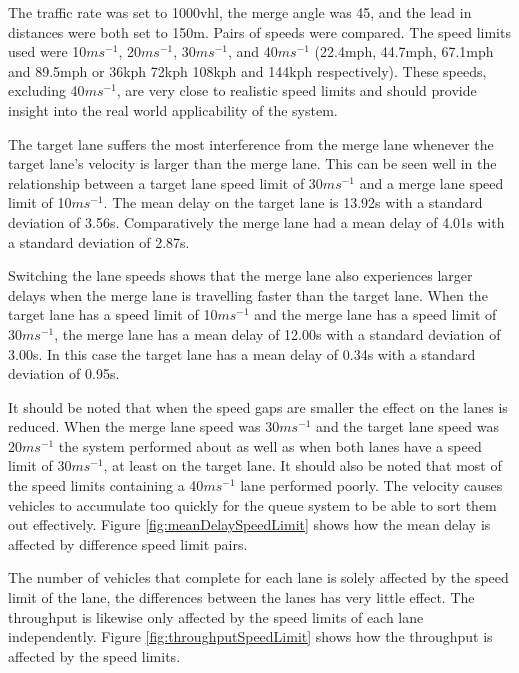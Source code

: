 The traffic rate was set to 1000\si{vhl}, the merge angle was 45\degree, and the lead in distances were both set to 150\si{m}. Pairs of speeds were compared. The speed limits used were 10$\si{ms^{-1}}$, 20$\si{ms^{-1}}$, 30$\si{ms^{-1}}$, and 40$\si{ms^{-1}}$ (22.4\si{mph}, 44.7\si{mph}, 67.1\si{mph} and 89.5\si{mph} or 36\si{kph} 72\si{kph} 108\si{kph} and 144\si{kph} respectively). These speeds, excluding 40$\si{ms^{-1}}$, are very close to realistic speed limits and should provide insight into the real world applicability of the system.

The target lane suffers the most interference from the merge lane whenever the target lane's velocity is larger than the merge lane. This can be seen well in the relationship between a target lane speed limit of 30$\si{ms^{-1}}$ and a merge lane speed limit of 10$\si{ms^{-1}}$. The mean delay on the target lane is 13.92\si{s} with a standard deviation of 3.56\si{s}. Comparatively the merge lane had a mean delay of 4.01\si{s} with a standard deviation of 2.87\si{s}. 

Switching the lane speeds shows that the merge lane also experiences larger delays when the merge lane is travelling faster than the target lane. When the target lane has a speed limit of 10$\si{ms^{-1}}$ and the merge lane has a speed limit of 30$\si{ms^{-1}}$, the merge lane has a mean delay of 12.00\si{s} with a standard deviation of 3.00\si{s}. In this case the target lane has a mean delay of 0.34\si{s} with a standard deviation of 0.95\si{s}.

It should be noted that when the speed gaps are smaller the effect on the lanes is reduced. When the merge lane speed was 30$\si{ms^{-1}}$ and the target lane speed was 20$\si{ms^{-1}}$ the system performed about as well as when both lanes have a speed limit of 30$\si{ms^{-1}}$, at least on the target lane. It should also be noted that most of the speed limits containing a 40$\si{ms^{-1}}$ lane performed poorly. The velocity causes vehicles to accumulate too quickly for the queue system to be able to sort them out effectively. Figure \ref{fig:meanDelaySpeedLimit} shows how the mean delay is affected by difference speed limit pairs.

The number of vehicles that complete for each lane is solely affected by the speed limit of the lane, the differences between the lanes has very little effect. The throughput is likewise only affected by the speed limits of each lane independently. Figure \ref{fig:throughputSpeedLimit} shows how the throughput is affected by the speed limits.

